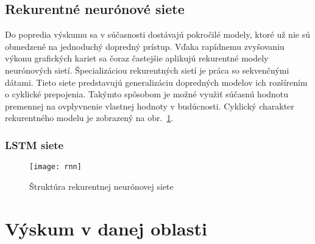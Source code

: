 \subsection{Rekurentné neurónové siete}
\label{analyza_pokrocile_modely_nn}

Do popredia výskumu sa v súčasnosti dostávajú pokročilé modely, ktoré už nie sú obmedzené na jednoduchý dopredný prístup. Vďaka rapídnemu zvyšovaniu výkonu grafických kariet sa čoraz častejšie aplikujú rekurentné modely neurónových sietí. Špecializáciou rekurentných sietí je práca so sekvenčnými dátami. Tieto siete predstavujú generalizáciu dopredných modelov ich rozšírením o cyklické prepojenia. Takýmto spôsobom je možné využiť súčasnú hodnotu premennej na ovplyvnenie vlastnej hodnoty v budúcnosti. Cyklický charakter rekurentného modelu je zobrazený na obr.~\ref{fig:rnn}.

\subsubsection{LSTM siete}

\begin{figure}[H]
\begin{center}\texttt{[image: rnn]}\end{center}
\caption[rnn]{Štruktúra rekurentnej neurónovej siete}\label{fig:rnn}
\end{figure}

\section{Výskum v danej oblasti}
\label{analyza_vyskum_danej_oblasti}











